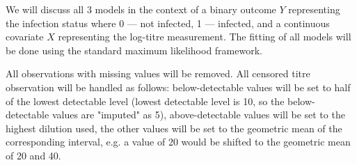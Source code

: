 We will discuss all 3 models in the context of a binary outcome $Y$ representing the infection status where 0 --- not infected, 1 --- infected, and a continuous covariate $X$ representing the log-titre measurement. The fitting of all models will be done using the standard maximum likelihood framework. 

All observations with missing values will be removed. All censored titre observation will be handled as follows: below-detectable values will be set to half of the lowest detectable level (lowest detectable level is 10, so the below-detectable values are "imputed" as 5), above-detectable values will be set to the highest dilution used, the other values will be set to the geometric mean of the corresponding interval, e.g. a value of 20 would be shifted to the geometric mean of 20 and 40.
